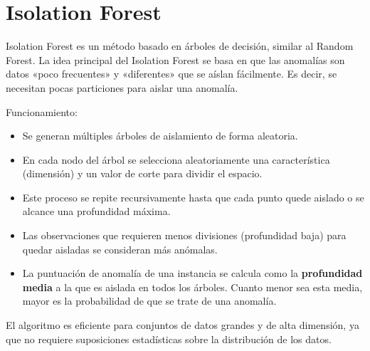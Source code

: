 \section{Isolation Forest}

Isolation Forest es un método basado en árboles de decisión, similar al Random Forest. La idea principal del Isolation Forest se basa en que las anomalías son datos «poco frecuentes» y «diferentes» que se aíslan fácilmente. Es decir, se necesitan pocas particiones para aislar una anomalía.

Funcionamiento:

\begin{itemize}
    \item Se generan múltiples árboles de aislamiento de forma aleatoria.
    \item En cada nodo del árbol se selecciona aleatoriamente una característica (dimensión) y un valor de corte para dividir el espacio.
    \item Este proceso se repite recursivamente hasta que cada punto quede aislado o se alcance una profundidad máxima.
    \item Las observaciones que requieren menos divisiones (profundidad baja) para quedar aisladas se consideran más anómalas.
    \item La puntuación de anomalía de una instancia se calcula como la \textbf{profundidad media} a la que es aislada en todos los árboles. Cuanto menor sea esta media, mayor es la probabilidad de que se trate de una anomalía.
\end{itemize}

El algoritmo es eficiente para conjuntos de datos grandes y de alta dimensión, ya que no requiere suposiciones estadísticas sobre la distribución de los datos.
